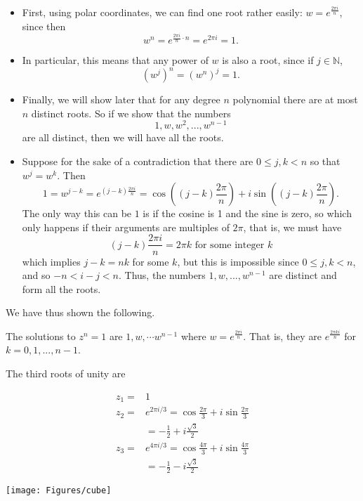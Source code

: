 \documentclass[11pt,dvipsnames]{book}
\numberwithin{equation}{section} %
\numberwithin{figure}{section} %
\numberwithin{table}{section} %
\begin{document}
\begin{itemize}
\item First, using polar coordinates, we can find one root rather easily: $w=e^{\frac{2\pi i}{n}}$, since then 
\[
w^{n} = e^{\frac{2\pi i}{n}\cdot n}=e^{2\pi i}=1.\]
\item In particular, this means that any power of $w$ is also a root, since if $j\in\mathbb{N}$, 
\[
(w^{j} )^{n} = (w^{n})^{j}=1.
\]
\item Finally, we will show later that for any degree $n$ polynomial there are at most $n$ distinct roots. So if we show that the numbers
\[
1,w,w^{2},...,w^{n-1}
\]
are all distinct, then we will have all the roots. \\

\item Suppose for the sake of a contradiction that there are $0\leq j,k<n$ so that $w^{j}=w^{k}$. Then
\[
1=w^{j-k}=e^{(j-k)\frac{2\pi i}{n}} = \cos \left((j-k)\frac{2\pi }{n}\right)+i\sin \left((j-k)\frac{2\pi }{n}\right).\]
The only way this can be $1$ is if the cosine is 1 and the sine is zero, so which only happens if their arguments are multiples of $2\pi$, that is, we must have 
\[
(j-k)\frac{2\pi i}{n} = 2\pi k \mbox{ for some integer }k\]
which implies $j-k=nk$ for some $k$, but this is impossible since $0\leq j,k<n$, and so $-n<i-j<n$. Thus, the numbers $1,w,...,w^{n-1}$ are distinct and form all the roots.
\end{itemize}

We have thus shown the following.

\begin{theorem}
The solutions to $z^{n}=1$ are $1,w,\cdots w^{n-1}$ where $w=e^{\frac{2\pi i}{n}}$. That is, they are $e^{\frac{2\pi k i}{n}}$ for $k=0,1,...,n-1$.
\end{theorem}







\begin{example}

The third roots of unity are
\begin{multicols}{2}
\vspace{-10pt}
\begin{align*}
z_1=&1\\
z_2=& e^{2\pi i/3} =  \cos \frac{2\pi}{3} + i\sin \frac{2\pi}{3} \\
& = -\frac{1}{2}+i\frac{\sqrt{3}}{2} \\
z_3= & e^{4\pi i/3} = \cos \frac{4\pi}{3} + i\sin \frac{4\pi}{3} \\ 
& = -\frac{1}{2}-i\frac{\sqrt{3}}{2} 
\end{align*}
\begin{center}
\texttt{[image: Figures/cube]}
\end{center}
\end{multicols}
\end{example}
 
\end{document}
